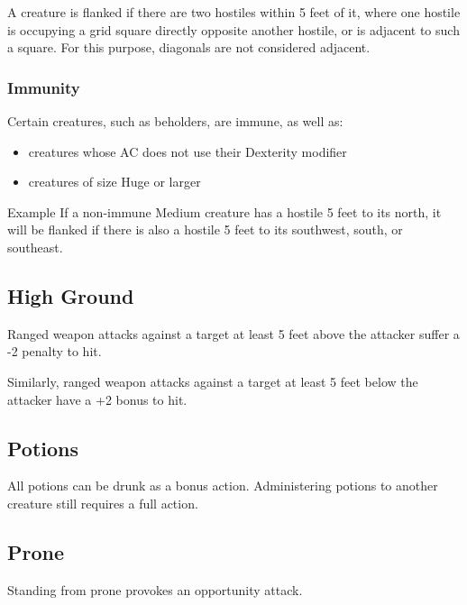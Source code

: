 \documentclass[House_Rules.tex]{subfiles}
\begin{document}
A creature is flanked if there are two hostiles within 5 feet of it, where one hostile is occupying a grid square directly opposite another hostile, or is adjacent to such a square. For this purpose, diagonals are not considered adjacent.

\subsubsection{Immunity}
Certain creatures, such as beholders, are immune, as well as:
\begin{itemize}
    \item creatures whose AC does not use their Dexterity modifier
    \item creatures of size Huge or larger
\end{itemize}

\begin{DndComment}{Example}
If a non-immune Medium creature has a hostile 5 feet to its north, it will be flanked if there is also a hostile 5 feet to its southwest, south, or southeast.
\end{DndComment}

\subsection{High Ground}
Ranged weapon attacks against a target at least 5 feet above the attacker suffer a -2 penalty to hit.

Similarly, ranged weapon attacks against a target at least 5 feet below the attacker have a +2 bonus to hit.

\subsection{Potions}

All potions can be drunk as a bonus action. Administering potions to another creature still requires a full action.

\subsection{Prone}
Standing from prone provokes an opportunity attack.
\end{document}
